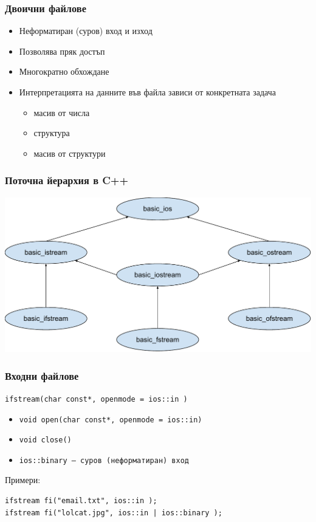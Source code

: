 \documentclass{beamer}
\begin{document}
\begin{frame}
  \frametitle{Двоични файлове}
  \begin{itemize}
  \item Неформатиран (суров) вход и изход
  \item Позволява пряк достъп
  \item Многократно обхождане
  \item Интерпретацията на данните във файла зависи от конкретната задача
    \begin{itemize}
    \item  масив от числа
    \item структура
    \item масив от структури
    \end{itemize}
  \end{itemize}
\end{frame}


\begin{frame}
  \frametitle{Поточна йерархия в C++}

  \includegraphics[width=\textwidth]{images/stream_hierarchy.pdf}
\end{frame}

\begin{frame}[fragile]
  \frametitle{Входни файлове}

  \verb#ifstream(char const*, openmode = ios::in )#
  \vspace{1em}

  \begin{itemize}
  \item \verb#void open(char const*, openmode = ios::in)#
  \item \verb#void close()#
  \item \tt{ios::binary} — суров (неформатиран) вход
  \end{itemize}
  \vspace{3em}

  Примери:
\begin{verbatim}
ifstream fi("email.txt", ios::in );
ifstream fi("lolcat.jpg", ios::in | ios::binary );
\end{verbatim}
\end{frame}
\end{document}
